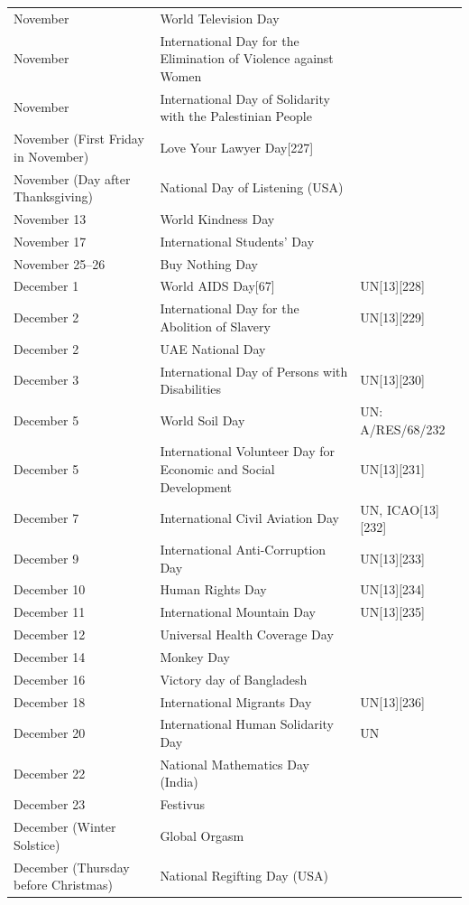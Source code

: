 \documentclass[
  openany]{book}
\begin{document}
\begin{longtable}[t]{>{\raggedright\arraybackslash}p{8em}>{\raggedright\arraybackslash}p{20em}>{\raggedright\arraybackslash}p{12em}}
\addlinespace
21 November & World Television Day & \\
25 November & International Day for the Elimination of Violence against Women & \\
29 November & International Day of Solidarity with the Palestinian People & \\
November (First Friday in November) & Love Your Lawyer Day[227] & \\
November (Day after Thanksgiving) & National Day of Listening (USA) & \\
\addlinespace
November 13 & World Kindness Day & \\
November 17 & International Students' Day & \\
November 25–26 & Buy Nothing Day & \\
December 1 & World AIDS Day[67] & UN[13][228]\\
December 2 & International Day for the Abolition of Slavery & UN[13][229]\\
\addlinespace
December 2 & UAE National Day & \\
December 3 & International Day of Persons with Disabilities & UN[13][230]\\
December 5 & World Soil Day & UN: A/RES/68/232\\
December 5 & International Volunteer Day for Economic and Social Development & UN[13][231]\\
December 7 & International Civil Aviation Day & UN, ICAO[13][232]\\
\addlinespace
December 9 & International Anti-Corruption Day & UN[13][233]\\
December 10 & Human Rights Day & UN[13][234]\\
December 11 & International Mountain Day & UN[13][235]\\
December 12 & Universal Health Coverage Day & \\
December 14 & Monkey Day & \\
\addlinespace
December 16 & Victory day of Bangladesh & \\
December 18 & International Migrants Day & UN[13][236]\\
December 20 & International Human Solidarity Day & UN\\
December 22 & National Mathematics Day (India) & \\
December 23 & Festivus & \\
\addlinespace
December (Winter Solstice) & Global Orgasm & \\
December (Thursday before Christmas) & National Regifting Day (USA) & \\
\bottomrule
\end{longtable}
\end{document}
